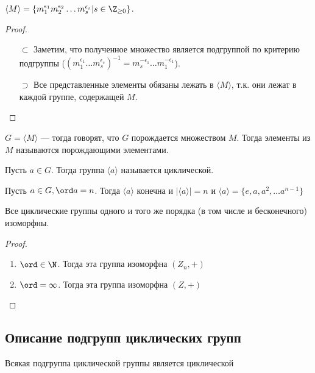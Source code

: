 \begin{theorem}
    \(\langle M \rangle = \{m_1^{\epsilon_1}m_2^{\epsilon_2}\dots m_s^{\epsilon_s} | s \in \Z_{\ge 0}\}\).
\end{theorem}
\begin{proof}
    \begin{enumerate}
        \item[\(\subset\)] Заметим, что полученное множество является подгруппой по критерию подгруппы (\((m_1^{\epsilon_1}\dots m_s^{\epsilon_s})^{-1} = m_s^{-\epsilon_1}\dots m_1^{-\epsilon_1}\)).
        \item[\(\supset\)] Все представленные элементы обязаны лежать в \(\langle M \rangle\), т.к. они лежат в каждой группе, содержащей \(M\).
    \end{enumerate}
\end{proof}

\begin{definition}
    \(G = \langle M \rangle\) --- тогда говорят, что \(G\) порождается множеством \(M\). Тогда элементы из \(M\) называются порождающими элементами.
\end{definition}

\begin{definition}
    Пусть \(a \in G\). Тогда группа \(\langle a \rangle \) называется циклической.
\end{definition}

\begin{theorem}
    Пусть \(a \in G, \ord a = n\). Тогда \(\langle a \rangle\) конечна и \(|\langle a \rangle| = n\) и \(\langle a \rangle = \{e, a, a^2, \dots a^{n - 1}\}\) 
\end{theorem}

\begin{theorem}
    Все циклические группы одного и того же порядка (в том числе и бесконечного) изоморфны.
\end{theorem}
\begin{proof}
    \begin{enumerate}
        \item \(\ord \in \N\). Тогда эта группа изоморфна \((Z_n, +)\)
        \item \(\ord = \infty\). Тогда эта группа изоморфна \((Z, +)\)
    \end{enumerate}
\end{proof}

\subsection{Описание подгрупп циклических групп}
\begin{theorem}
    Всякая подгруппа циклической группы является циклической
\end{theorem}

